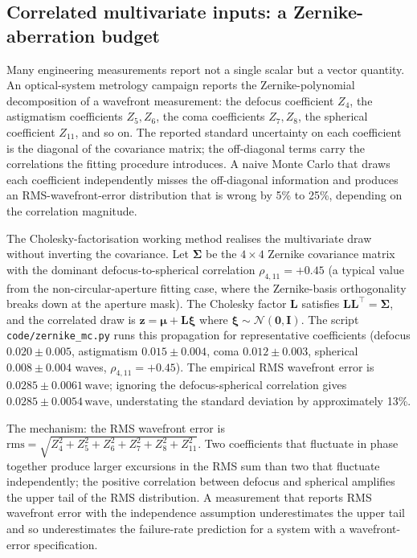 \subsection{Correlated multivariate inputs: a Zernike-aberration budget}

Many engineering measurements report not a single scalar but a
vector quantity. An optical-system metrology campaign reports the
Zernike-polynomial decomposition of a wavefront measurement: the
defocus coefficient $Z_{4}$, the astigmatism coefficients
$Z_{5}, Z_{6}$, the coma coefficients $Z_{7}, Z_{8}$, the spherical
coefficient $Z_{11}$, and so on. The reported standard uncertainty
on each coefficient is the diagonal of the covariance matrix; the
off-diagonal terms carry the correlations the fitting procedure
introduces. A naive Monte Carlo that draws each coefficient
independently misses the off-diagonal information and produces an
RMS-wavefront-error distribution that is wrong by 5\% to 25\%,
depending on the correlation magnitude.

The Cholesky-factorisation working method realises the multivariate
draw without inverting the covariance. Let $\boldsymbol{\Sigma}$
be the $4 \times 4$ Zernike covariance matrix with the dominant
defocus-to-spherical correlation $\rho_{4,11} = +0.45$ (a typical
value from the non-circular-aperture fitting case, where the
Zernike-basis orthogonality breaks down at the aperture mask). The
Cholesky factor $\mathbf{L}$ satisfies $\mathbf{L}\mathbf{L}^{\top}
= \boldsymbol{\Sigma}$, and the correlated draw is $\boldsymbol{z}
= \boldsymbol{\mu} + \mathbf{L} \boldsymbol{\xi}$ where $\boldsymbol{\xi}
\sim \mathcal{N}(\mathbf{0}, \mathbf{I})$. The script
\texttt{code/zernike\_mc.py} runs this propagation for representative
coefficients (defocus $0.020 \pm 0.005$, astigmatism $0.015 \pm
0.004$, coma $0.012 \pm 0.003$, spherical $0.008 \pm 0.004$
waves, $\rho_{4,11} = +0.45$). The empirical RMS wavefront error
is $0.0285 \pm 0.0061\,\text{wave}$; ignoring the
defocus-spherical correlation gives $0.0285 \pm 0.0054\,\text{wave}$,
understating the standard deviation by approximately 13\%.

The mechanism: the RMS wavefront error is
$\text{rms} = \sqrt{Z_{4}^{2} + Z_{5}^{2} + Z_{6}^{2} + Z_{7}^{2}
+ Z_{8}^{2} + Z_{11}^{2}}$. Two coefficients that fluctuate in
phase together produce larger excursions in the RMS sum than two
that fluctuate independently; the positive correlation between
defocus and spherical amplifies the upper tail of the RMS
distribution. A measurement that reports RMS wavefront error with
the independence assumption underestimates the upper tail and so
underestimates the failure-rate prediction for a system with a
wavefront-error specification.

